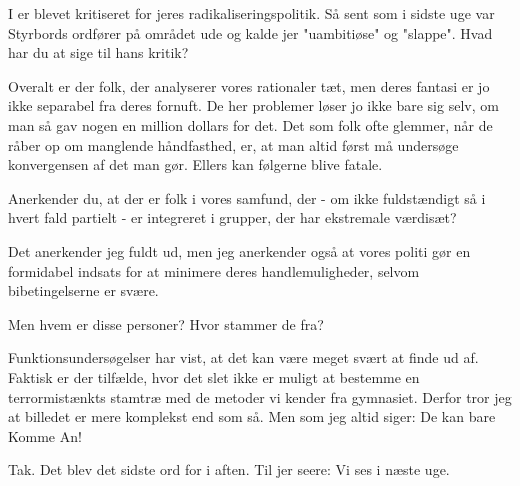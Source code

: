 \documentclass[a4paper,11pt]{article}
\begin{document}
\begin{sketch}
 I er blevet kritiseret for jeres radikaliseringspolitik. Så sent som i sidste uge var Styrbords ordfører på området ude og kalde jer "uambitiøse" og "slappe". Hvad har du at sige til hans kritik?

 Overalt er der folk, der analyserer vores rationaler tæt, men deres fantasi er jo ikke separabel fra deres fornuft. De her problemer løser jo ikke bare sig selv, om man så gav nogen en million dollars for det. Det som folk ofte glemmer, når de råber op om manglende håndfasthed, er, at man altid først må undersøge konvergensen af det man gør. Ellers kan følgerne blive fatale.

 Anerkender du, at der er folk i vores samfund, der - om ikke fuldstændigt så i hvert fald partielt - er integreret i grupper, der har ekstremale værdisæt?

 Det anerkender jeg fuldt ud, men jeg anerkender også at vores politi gør en formidabel indsats for at minimere deres handlemuligheder, selvom bibetingelserne er svære.

 Men hvem er disse personer? Hvor stammer de fra?

 Funktionsundersøgelser har vist, at det kan være meget svært at finde ud af. Faktisk er der tilfælde, hvor det slet ikke er muligt at bestemme en terrormistænkts stamtræ med de metoder vi kender fra gymnasiet. Derfor tror jeg at billedet er mere komplekst end som så. Men som jeg altid siger: De kan bare Komme An!

 Tak. Det blev det sidste ord for i aften. Til jer seere: Vi ses i næste uge. %

\end{sketch}
\end{document}
